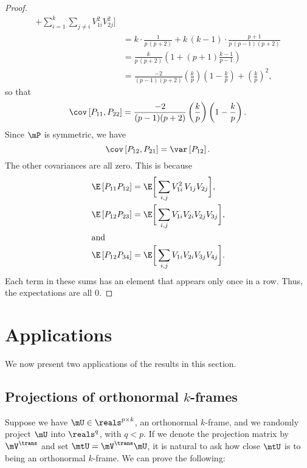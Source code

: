 \begin{proof}
\begin{align*}
                  + \sum_{i=1}^k
                    \sum_{j\neq i} V_{1i}^2 V_{2j}^2
              \bigg] \\
        &= k \cdot \frac{1}{ p \, (p+2) }
           + k \, (k-1) \cdot \frac{ p+1 }{ p \, (p-1) (p+2) } \\
        &= \frac{k}{ p \, (p+2) }
           \left( 1 + (p+1) \frac{k-1}{p-1} \right) \\
        &= \frac{-2}{(p-1)(p+2)}
           \left(\frac{k}{p}\right) \left( 1 - \frac{k}{p} \right)
           + \left( \frac{k}{p} \right)^2,
    \end{align*}
    so that
    \[
        \cov \left[ P_{11}, P_{22} \right]
        = \frac{-2}{ (p-1) (p+2) }
           \left(\frac{k}{p}\right) \left( 1 - \frac{k}{p} \right).
    \]
    Since $\mP$ is symmetric, we have
    \[
        \cov \left[ P_{12}, P_{21} \right]
        = \var \left[ P_{12} \right].
    \]
    The other covariances are all zero.  This is because
    \begin{align*}
        \E \left[ P_{11} P_{12} \right]
        &= \E \bigg[ 
                  \sum_{i,j} V_{1i}^2 \, V_{1j}  V_{2j} 
              \bigg], \\
        \E \left[ P_{12} P_{23} \right]
        &= \E \bigg[ 
                \sum_{i,j} V_{1i} V_{2i} V_{2j} V_{3j}
              \bigg], \\
    \intertext{and}
        \E \left[ P_{12} P_{34} \right]
        &= \E \bigg[ 
                \sum_{i,j} V_{1i} V_{2i} V_{3j} V_{4j}
              \bigg].
    \end{align*}
    Each term in these sums has an element that appears only once in a row.
    Thus, the expectations are all $0$.
\end{proof}


\section{Applications}

We now present two applications of the results in this section.

\subsection{Projections of orthonormal $k$-frames}

Suppose we have $\mU \in \reals^{p \times k}$, an orthonormal $k$-frame,
and we randomly project $\mU$ into $\reals^q$, with $q < p$.  If we denote
the projection matrix by $\mV^\trans$ and set $\mtU =\mV^\trans \mU$, it is 
natural to ask how close $\mtU$ is to being an orthonormal $k$-frame.
We can prove the following:

